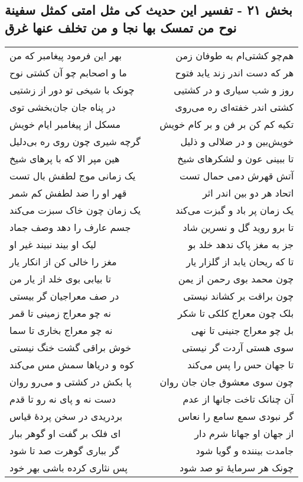 \begin{center}
\section*{بخش ۲۱ - تفسیر این حدیث کی مثل امتی کمثل سفینة نوح من تمسک بها  نجا و من تخلف عنها غرق}
\label{sec:sh021}
\begin{longtable}{l p{0.5cm} r}
بهر این فرمود پیغامبر که من
&&
هم‌چو کشتی‌ام به طوفان زمن
\\
ما و اصحابم چو آن کشتی نوح
&&
هر که دست اندر زند یابد فتوح
\\
چونک با شیخی تو دور از زشتیی
&&
روز و شب سیاری و در کشتیی
\\
در پناه جان جان‌بخشی توی
&&
کشتی اندر خفته‌ای ره می‌روی
\\
مسکل از پیغامبر ایام خویش
&&
تکیه کم کن بر فن و بر کام خویش
\\
گرچه شیری چون روی ره بی‌دلیل
&&
خویش‌بین و در ضلالی و ذلیل
\\
هین مپر الا که با پرهای شیخ
&&
تا ببینی عون و لشکرهای شیخ
\\
یک زمانی موج لطفش بال تست
&&
آتش قهرش دمی حمال تست
\\
قهر او را ضد لطفش کم شمر
&&
اتحاد هر دو بین اندر اثر
\\
یک زمان چون خاک سبزت می‌کند
&&
یک زمان پر باد و گبزت می‌کند
\\
جسم عارف را دهد وصف جماد
&&
تا برو روید گل و نسرین شاد
\\
لیک او بیند نبیند غیر او
&&
جز به مغز پاک ندهد خلد بو
\\
مغز را خالی کن از انکار یار
&&
تا که ریحان یابد از گلزار یار
\\
تا بیابی بوی خلد از یار من
&&
چون محمد بوی رحمن از یمن
\\
در صف معراجیان گر بیستی
&&
چون براقت بر کشاند نیستی
\\
نه چو معراج زمینی تا قمر
&&
بلک چون معراج کلکی تا شکر
\\
نه چو معراج بخاری تا سما
&&
بل چو معراج جنینی تا نهی
\\
خوش براقی گشت خنگ نیستی
&&
سوی هستی آردت گر نیستی
\\
کوه و دریاها سمش مس می‌کند
&&
تا جهان حس را پس می‌کند
\\
پا بکش در کشتی و می‌رو روان
&&
چون سوی معشوق جان جان روان
\\
دست نه و پای نه رو تا قدم
&&
آن چنانک تاخت جانها از عدم
\\
بردریدی در سخن پردهٔ قیاس
&&
گر نبودی سمع سامع را نعاس
\\
ای فلک بر گفت او گوهر ببار
&&
از جهان او جهانا شرم دار
\\
گر بباری گوهرت صد تا شود
&&
جامدت بیننده و گویا شود
\\
پس نثاری کرده باشی بهر خود
&&
چونک هر سرمایهٔ تو صد شود
\\
\end{longtable}
\end{center}
